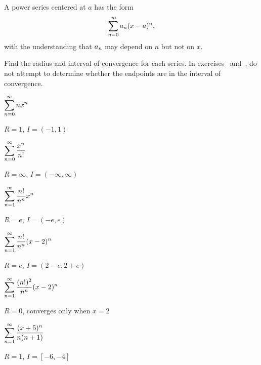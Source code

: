 \begin{definition} A power series centered at $a$ has the form
$$\displaystyle\sum_{n=0}^\infty a_n(x-a)^n,$$ 
with the understanding that $\displaystyle a_n$ may depend on $n$ but not on
$x$.
\end{definition}

\begin{exercises}

Find the radius and interval of convergence for each series.  In
exercises~ and~,
do not attempt to determine whether the endpoints are in the
interval of convergence.

\twocol

\begin{exercise} $\displaystyle\sum_{n=0}^\infty n x^n$
\begin{answer} $R=1$, $I=(-1,1)$
\end{answer}\end{exercise}

\begin{exercise} $\displaystyle\sum_{n=0}^\infty {x^n\over n!}$
\begin{answer} $R=\infty$, $I=(-\infty,\infty)$
\end{answer}\end{exercise}

\begin{exercise} 
\relax\label{exer:no endpoints one}
$\displaystyle\sum_{n=1}^\infty {n!\over n^n}x^n$
\begin{answer} $R=e$, $I=(-e,e)$
\end{answer}\end{exercise}

\begin{exercise} 
\relax\label{exer:no endpoints two}
$\displaystyle\sum_{n=1}^\infty {n!\over n^n}(x-2)^n$
\begin{answer} $R=e$, $I=(2-e,2+e)$
\end{answer}\end{exercise}

\begin{exercise} $\displaystyle\sum_{n=1}^\infty {(n!)^2\over n^n}(x-2)^n$
\begin{answer} $R=0$, converges only when $x=2$
\end{answer}\end{exercise}

\begin{exercise} $\displaystyle\sum_{n=1}^\infty {(x+5)^n\over n(n+1)}$
\begin{answer} $R=1$, $I=[-6,-4]$
\end{answer}\end{exercise}

\endtwocol

\end{exercises}

